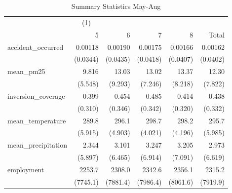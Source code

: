 \begin{table}[htbp]\centering
\caption{Summary Statistics May-Aug\label{sumstats5-8}}
\begin{tabular}{l*{5}{D{.}{.}{-1}}}
\toprule
                    &&            &            &            &            \\
                    &           5&           6&           7&           8&       Total\\
\midrule
accident\_occurred   &     0.00118&     0.00190&     0.00175&     0.00166&     0.00162\\
                    &    (0.0344)&    (0.0435)&    (0.0418)&    (0.0407)&    (0.0402)\\
\addlinespace
mean\_pm25           &       9.816&       13.03&       13.02&       13.37&       12.30\\
                    &     (5.548)&     (9.293)&     (7.246)&     (8.218)&     (7.822)\\
\addlinespace
inversion\_coverage  &       0.399&       0.454&       0.485&       0.414&       0.438\\
                    &     (0.310)&     (0.346)&     (0.342)&     (0.320)&     (0.332)\\
\addlinespace
mean\_temperature    &       289.8&       296.1&       298.7&       298.2&       295.7\\
                    &     (5.915)&     (4.903)&     (4.021)&     (4.196)&     (5.985)\\
\addlinespace
mean\_precipitation  &       2.344&       3.101&       3.247&       3.205&       2.973\\
                    &     (5.897)&     (6.465)&     (6.914)&     (7.091)&     (6.619)\\
\addlinespace
employment          &      2253.7&      2308.0&      2342.6&      2356.1&      2315.2\\
                    &    (7745.1)&    (7881.4)&    (7986.4)&    (8061.6)&    (7919.9)\\
\bottomrule
\end{tabular}
\end{table}
